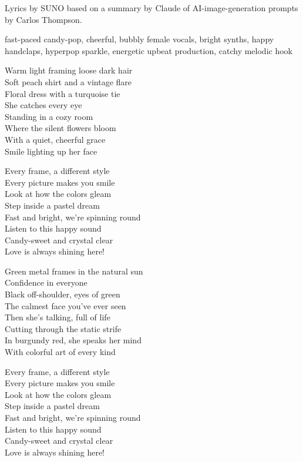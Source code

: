 
\begin{notes}
Lyrics by SUNO based on a summary by Claude of AI-image-generation prompts by Carlos Thompson.
\end{notes}
\begin{style}
fast-paced candy-pop, cheerful, bubbly female vocals, bright synths, happy handclaps, hyperpop sparkle, energetic upbeat production, catchy melodic hook
\end{style}
\begin{lyrics}

Warm light framing loose dark hair\\
Soft peach shirt and a vintage flare\\
Floral dress with a turquoise tie\\
She catches every eye\\
Standing in a cozy room\\
Where the silent flowers bloom\\
With a quiet, cheerful grace\\
Smile lighting up her face

Every frame, a different style\\
Every picture makes you smile\\
Look at how the colors gleam\\
Step inside a pastel dream\\
Fast and bright, we're spinning round\\
Listen to this happy sound\\
Candy-sweet and crystal clear\\
Love is always shining here!

Green metal frames in the natural sun\\
Confidence in everyone\\
Black off-shoulder, eyes of green\\
The calmest face you've ever seen\\
Then she's talking, full of life\\
Cutting through the static strife\\
In burgundy red, she speaks her mind\\
With colorful art of every kind

Every frame, a different style\\
Every picture makes you smile\\
Look at how the colors gleam\\
Step inside a pastel dream\\
Fast and bright, we're spinning round\\
Listen to this happy sound\\
Candy-sweet and crystal clear\\
Love is always shining here!


\end{lyrics}
